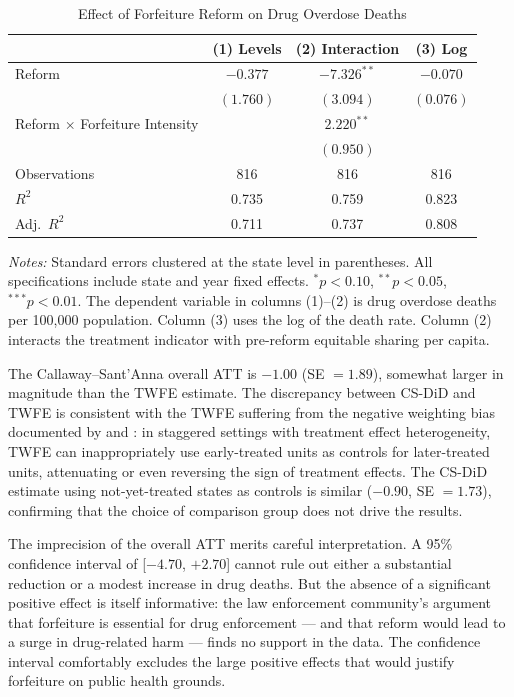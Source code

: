 \documentclass[12pt]{article}
\begin{document}
\begin{table}[H]
\centering
\caption{Effect of Forfeiture Reform on Drug Overdose Deaths}
\label{tab:main}
\begin{threeparttable}
\begin{tabular}{lccc}
\toprule
& (1) Levels & (2) Interaction & (3) Log \\
\midrule
Reform & $-0.377$ & $-7.326^{**}$ & $-0.070$ \\
& $(1.760)$ & $(3.094)$ & $(0.076)$ \\
Reform $\times$ Forfeiture Intensity & & $2.220^{**}$ & \\
& & $(0.950)$ & \\
\midrule
Observations & 816 & 816 & 816 \\
$R^2$ & 0.735 & 0.759 & 0.823 \\
Adj.\ $R^2$ & 0.711 & 0.737 & 0.808 \\
\bottomrule
\end{tabular}
\begin{tablenotes}[flushleft]
\small
\item \textit{Notes:} Standard errors clustered at the state level in parentheses. All specifications include state and year fixed effects. $^{*}p<0.10$, $^{**}p<0.05$, $^{***}p<0.01$. The dependent variable in columns (1)--(2) is drug overdose deaths per 100,000 population. Column (3) uses the log of the death rate. Column (2) interacts the treatment indicator with pre-reform equitable sharing per capita.
\end{tablenotes}
\end{threeparttable}
\end{table}

The Callaway--Sant'Anna overall ATT is $-1.00$ (SE $= 1.89$), somewhat larger in magnitude than the TWFE estimate. The discrepancy between CS-DiD and TWFE is consistent with the TWFE suffering from the negative weighting bias documented by \citet{goodman2021difference} and \citet{de2020two}: in staggered settings with treatment effect heterogeneity, TWFE can inappropriately use early-treated units as controls for later-treated units, attenuating or even reversing the sign of treatment effects. The CS-DiD estimate using not-yet-treated states as controls is similar ($-0.90$, SE $= 1.73$), confirming that the choice of comparison group does not drive the results.

The imprecision of the overall ATT merits careful interpretation. A 95\% confidence interval of [$-4.70$, $+2.70$] cannot rule out either a substantial reduction or a modest increase in drug deaths. But the absence of a significant positive effect is itself informative: the law enforcement community's argument that forfeiture is essential for drug enforcement --- and that reform would lead to a surge in drug-related harm --- finds no support in the data. The confidence interval comfortably excludes the large positive effects that would justify forfeiture on public health grounds.
\end{document}
